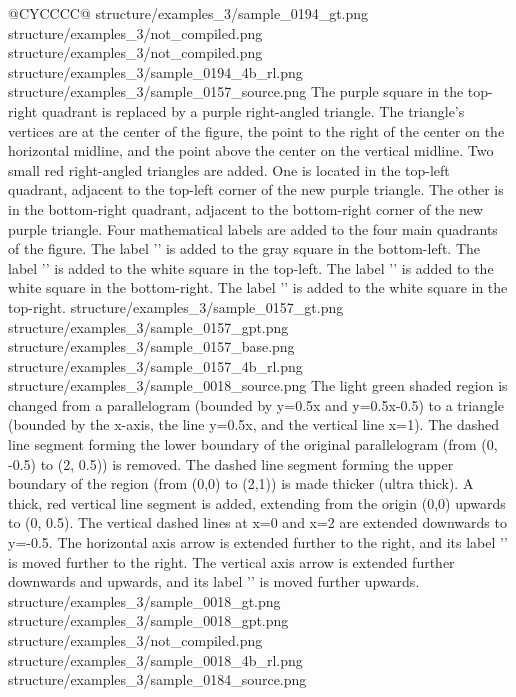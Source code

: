 \begin{table}[t]
\begin{tabularx}{\textwidth}{@{}CYCCCC@{}}
    {structure/examples_3/sample_0194_gt.png}
    {structure/examples_3/not_compiled.png}
    {structure/examples_3/not_compiled.png}
    {structure/examples_3/sample_0194_4b_rl.png}
    \midrule
    \exrowthreethree
    {structure/examples_3/sample_0157_source.png}
    {The purple square in the top-right quadrant is replaced by a purple right-angled triangle. The triangle's vertices are at the center of the figure, the point to the right of the center on the horizontal midline, and the point above the center on the vertical midline. Two small red right-angled triangles are added. One is located in the top-left quadrant, adjacent to the top-left corner of the new purple triangle. The other is in the bottom-right quadrant, adjacent to the bottom-right corner of the new purple triangle. Four mathematical labels are added to the four main quadrants of the figure. The label '' is added to the gray square in the bottom-left. The label '' is added to the white square in the top-left. The label '' is added to the white square in the bottom-right. The label '' is added to the white square in the top-right.}
    {structure/examples_3/sample_0157_gt.png}
    {structure/examples_3/sample_0157_gpt.png}
    {structure/examples_3/sample_0157_base.png}
    {structure/examples_3/sample_0157_4b_rl.png}
    \midrule
    \exrowthreefour
    {structure/examples_3/sample_0018_source.png}
    {The light green shaded region is changed from a parallelogram (bounded by y=0.5x and y=0.5x-0.5) to a triangle (bounded by the x-axis, the line y=0.5x, and the vertical line x=1). The dashed line segment forming the lower boundary of the original parallelogram (from (0, -0.5) to (2, 0.5)) is removed. The dashed line segment forming the upper boundary of the region (from (0,0) to (2,1)) is made thicker (ultra thick). A thick, red vertical line segment is added, extending from the origin (0,0) upwards to (0, 0.5). The vertical dashed lines at x=0 and x=2 are extended downwards to y=-0.5. The horizontal axis arrow is extended further to the right, and its label '' is moved further to the right. The vertical axis arrow is extended further downwards and upwards, and its label '' is moved further upwards.}
    {structure/examples_3/sample_0018_gt.png}
    {structure/examples_3/sample_0018_gpt.png}
    {structure/examples_3/not_compiled.png}
    {structure/examples_3/sample_0018_4b_rl.png}
    \midrule
    \exrowthreefive
    {structure/examples_3/sample_0184_source.png}

\end{tabularx}
\end{table}
